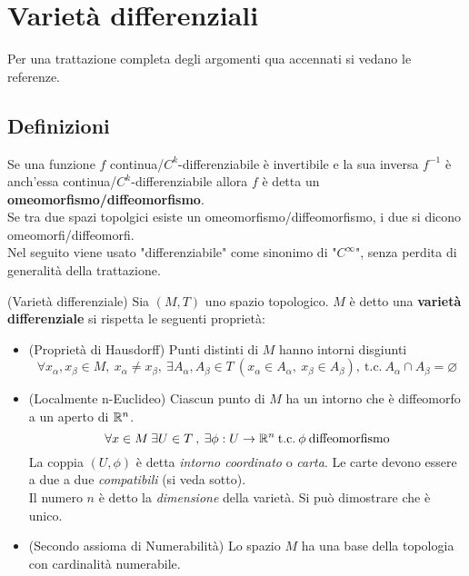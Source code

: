 \section{Varietà differenziali}\label{sec:vardiff}
Per una trattazione completa degli argomenti qua accennati si vedano le referenze.
\subsection{Definizioni}
Se una funzione $f$ continua/$C^k$-differenziabile è invertibile e la sua inversa $f^{-1}$
è anch'essa continua/$C^k$-differenziabile allora
$f$ è detta un \textbf{omeomorfismo/diffeomorfismo}.\\
Se tra due spazi topolgici esiste un omeomorfismo/diffeomorfismo, i due si dicono
omeomorfi/diffeomorfi.\\
Nel seguito viene usato "differenziabile" come sinonimo di "$C^\infty$", senza
perdita di generalità della trattazione.

\begin{definition}{(Varietà differenziale)}
\label{def:var_differenziale}
   Sia $(M ,T)$ uno spazio topologico. $M$ è detto una \textbf{varietà
   differenziale} si rispetta le seguenti proprietà:
  \begin{itemize}
     \item (Proprietà di Hausdorff) Punti distinti di $M$ hanno intorni disgiunti
     $$\forall x_\alpha,x_\beta \in M, \: x_\alpha \neq x_\beta , \:
       \exists A_\alpha , A_\beta \in T \: (x_\alpha \in A_\alpha , \:
       x_\beta \in A_\beta),
       \: \mathrm{t.c.} \: A_\alpha \cap A_\beta = \varnothing $$

     \item (Localmente n-Euclideo) Ciascun punto di $M$ ha un intorno che è
     diffeomorfo a un aperto di $\mathbb{R}^n$.
     $$
       \forall x \in M \: \exists U \in T \:,\: \exists\phi : U \to \mathbb{R}^n
          \mathrm{\: t.c.\:} \phi \mathrm{\: diffeomorfismo}
     $$
     La coppia $(U,\phi)$ è detta \emph{intorno coordinato} o \emph{carta}.
     Le carte devono essere a due a due \emph{compatibili} (si veda sotto).\\
     Il numero $n$ è detto la \emph{dimensione} della varietà. Si può dimostrare che è unico.

     \item (Secondo assioma di Numerabilità) Lo spazio $M$ ha una base della topologia
     con cardinalità numerabile.
  \end{itemize}
\end{definition}

